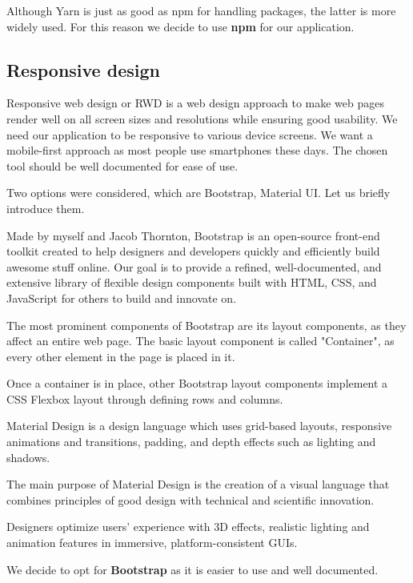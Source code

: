   Although Yarn is just as good as npm for handling packages, the latter is more widely used.
  For this reason we decide to use \textbf{npm} for our application. 

\subsection*{Responsive design}
  Responsive web design or RWD is a web design approach to make web pages render well on all screen sizes and resolutions while ensuring good usability.
  We need our application to be responsive to various device screens.
  We want a mobile-first approach as most people use smartphones these days.
  The chosen tool should be well documented for ease of use.

  Two options were considered, which are Bootstrap, Material UI.
  Let us briefly introduce them.

  Made by myself and Jacob Thornton, Bootstrap is an open-source front-end toolkit created to help designers and developers quickly and efficiently build awesome stuff online. Our goal is to provide a refined, well-documented, and extensive library of flexible design components built with HTML, CSS, and JavaScript for others to build and innovate on.

  The most prominent components of Bootstrap are its layout components, as they affect an entire web page. The basic layout component is called "Container", as every other element in the page is placed in it.

  Once a container is in place, other Bootstrap layout components implement a CSS Flexbox layout through defining rows and columns.

  Material Design is a design language which uses grid-based layouts, responsive animations and transitions, padding, and depth effects such as lighting and shadows.

  The main purpose of Material Design is the creation of a visual language that combines principles of good design with technical and scientific innovation. 

  Designers optimize users' experience with 3D effects, realistic lighting and animation features in immersive, platform-consistent GUIs.

  We decide to opt for \textbf{Bootstrap} as it is easier to use and well documented.

